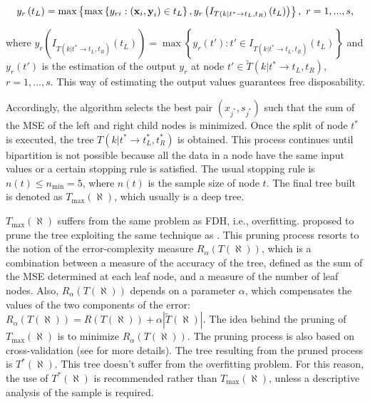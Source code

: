 \begin{equation} \label{(3)} 
y_{r} \left(t_{L} \right)=\max \left\{\max \left\{y_{ri} :\left({\it \textbf{x}}_{i} ,{\it \textbf{y}}_{i} \right)\in t_{L} \right\},y_{r} \left(I_{T\left(k|t^{*} \to t_{L} ,t_{R} \right)} \left(t_{L} \right)\right)\right\},\, \, r=1,...,s, 
\end{equation}

where
\(y_{r} \left(I_{T\left(k|t^{*} \to t_{L} ,t_{R} \right)} \left(t_{L} \right)\right)= \max \left\{y_{r} \left(t'\right):t'\in I_{T\left(k|t^{*} \to t_{L} ,t_{R} \right)} \left(t_{L} \right)\right\}\)
and \(y_{r} \left(t'\right)\) is the estimation of the output \(y_{r}\)
at node \(t'\in \tilde{T}\left(k|t^{*} \to t_{L} ,t_{R} \right)\),
\(r=1,...,s\). This way of estimating the output values guarantees free
disposability.

Accordingly, the algorithm selects the best pair
\(\left(x_{j^{*} } ,s_{j^{*} } \right)\) such that the sum of the MSE of
the left and right child nodes is minimized. Once the split of node
\(t^{*}\) is executed, the tree
\(T\left(k|t^{*} \to t_{L}^{*} ,t_{R}^{*} \right)\) is obtained. This
process continues until bipartition is not possible because all the data
in a node have the same input values or a certain stopping rule is
satisfied. The usual stopping rule is
\(n\left(t\right)\le n_{\min } = 5\), where \(n(t)\) is the sample size
of node \(t\). The final tree built is denoted as
\(T_{\max } \left(\aleph \right)\), which usually is a deep tree.

\(T_{\max} \left(\aleph \right)\) suffers from the same problem as FDH,
i.e., overfitting. \citet{esteve2020} proposed to prune the tree
exploiting the same technique as \citet{breiman1984}. This pruning
process resorts to the notion of the error-complexity measure
\(R_{\alpha} \left(T\left(\aleph \right)\right)\), which is a
combination between a measure of the accuracy of the tree, defined as
the sum of the MSE determined at each leaf node, and a measure of the
number of leaf nodes. Also,
\(R_{\alpha } \left(T\left(\aleph \right)\right)\) depends on a
parameter \(\alpha\), which compensates the values of the two components
of the error:
\(R_{\alpha } \left(T\left(\aleph \right)\right)=R\left(T\left(\aleph \right)\right)+\alpha \left|\tilde{T}\left(\aleph \right)\right|\).
The idea behind the pruning of \(T_{\max } \left(\aleph \right)\) is to
minimize \(R_{\alpha } \left(T\left(\aleph \right)\right)\). The pruning
process is also based on cross-validation (see \citet{breiman1984} for
more details). The tree resulting from the pruned process is
\(T^{*} \left(\aleph \right)\). This tree doesn't suffer from the
overfitting problem. For this reason, the use of
\(T^{*} \left(\aleph \right)\) is recommended rather than
\(T_{\max } \left(\aleph \right)\), unless a descriptive analysis of the
sample is required.


